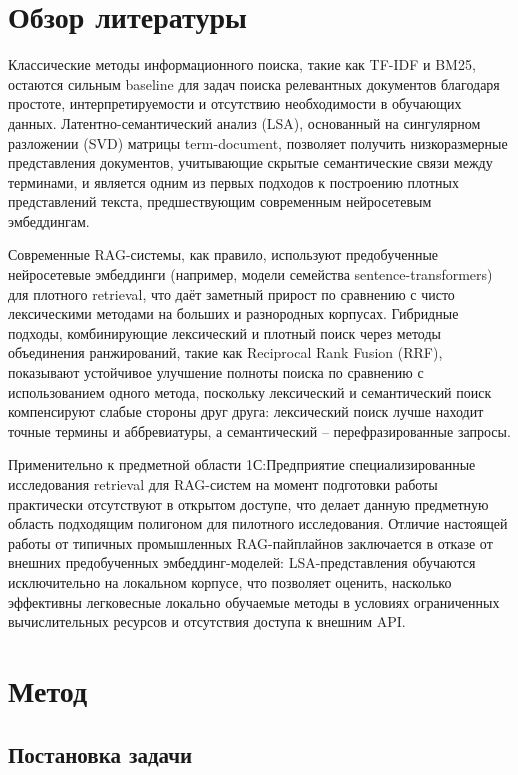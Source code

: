 \documentclass[11pt]{article}
\begin{document}
\section{Обзор литературы}

Классические методы информационного поиска, такие как TF-IDF и BM25,
остаются сильным baseline для задач поиска релевантных документов
благодаря простоте, интерпретируемости и отсутствию необходимости в
обучающих данных. Латентно-семантический анализ (LSA), основанный на
сингулярном разложении (SVD) матрицы term-document, позволяет получить
низкоразмерные представления документов, учитывающие скрытые семантические
связи между терминами, и является одним из первых подходов к построению
плотных представлений текста, предшествующим современным нейросетевым
эмбеддингам.

Современные RAG-системы, как правило, используют предобученные нейросетевые
эмбеддинги (например, модели семейства sentence-transformers) для плотного
retrieval, что даёт заметный прирост по сравнению с чисто лексическими
методами на больших и разнородных корпусах. Гибридные подходы, комбинирующие
лексический и плотный поиск через методы объединения ранжирований, такие
как Reciprocal Rank Fusion (RRF), показывают устойчивое улучшение полноты
поиска по сравнению с использованием одного метода, поскольку лексический
и семантический поиск компенсируют слабые стороны друг друга: лексический
поиск лучше находит точные термины и аббревиатуры, а семантический --
перефразированные запросы.

Применительно к предметной области 1С:Предприятие специализированные
исследования retrieval для RAG-систем на момент подготовки работы
практически отсутствуют в открытом доступе, что делает данную предметную
область подходящим полигоном для пилотного исследования. Отличие настоящей
работы от типичных промышленных RAG-пайплайнов заключается в отказе от
внешних предобученных эмбеддинг-моделей: LSA-представления обучаются
исключительно на локальном корпусе, что позволяет оценить, насколько
эффективны легковесные локально обучаемые методы в условиях ограниченных
вычислительных ресурсов и отсутствия доступа к внешним API.

\section{Метод}

\subsection{Постановка задачи}
\end{document}
